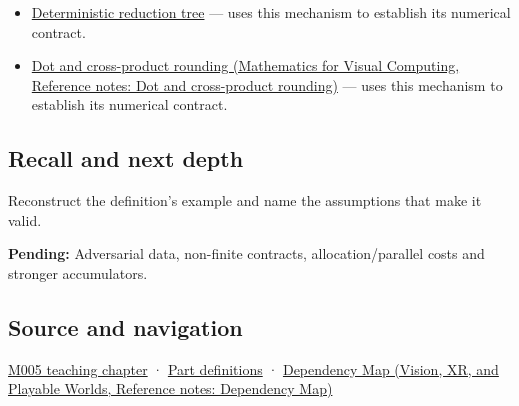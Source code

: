 \hypertarget{appendix-df318da57389-used-by}{}

\begin{itemize}
\tightlist
\item
  \hyperref[appendix-4c8e0238e7ee]{Deterministic reduction tree} --- uses this mechanism to establish its numerical contract.
\item
  \href{../02-Mathematics-for-Visual-Computing/main.pdf\#nameddest=appendix-5aef4f13483a}{Dot and cross-product rounding (Mathematics for Visual Computing, Reference notes: Dot and cross-product rounding)} --- uses this mechanism to establish its numerical contract.
\end{itemize}

\subsection{Recall and next depth}\label{appendix-df318da57389-recall-and-next-depth}

\hypertarget{appendix-df318da57389-recall-and-next-depth}{}

Reconstruct the definition's example and name the assumptions that make it valid.

\textbf{Pending:} Adversarial data, non-finite contracts, allocation/parallel costs and stronger accumulators.

\subsection{Source and navigation}\label{appendix-df318da57389-source-and-navigation}

\hypertarget{appendix-df318da57389-source-and-navigation}{}

\hyperref[01-foundations-i-ch001-when-arithmetic-meets-uncertainty]{M005 teaching chapter} · \hyperref[appendix-fd090d982a15-m005---parts-77-88]{Part definitions} · \href{../07-Vision-XR-and-Playable-Worlds/main.pdf\#nameddest=appendix-4ad47bdd269a}{Dependency Map (Vision, XR, and Playable Worlds, Reference notes: Dependency Map)}
